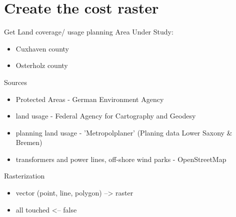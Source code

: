 \documentclass[usenames,dvipsnames,aspectratio=169]{beamer}
\begin{document}
\section{Create the cost raster}
\begin{frame}{Get Land coverage/ usage planning}
	Area Under Study:
	\begin{itemize}
		\item Cuxhaven county
		\item Osterholz county
	\end{itemize}
	
	Sources
	\begin{itemize}
		\item Protected Areas - German Environment Agency
		\item land usage - Federal Agency for Cartography and Geodesy
		\item planning land usage - 'Metropolplaner' (Planing data Lower Saxony \& Bremen)
		\item transformers and power lines, off-shore wind parks  - OpenStreetMap
	\end{itemize}
\end{frame}


\begin{frame}{Rasterization}
	\begin{itemize}
		\item vector (point, line, polygon) --> raster
		\item all touched <-- false
	\end{itemize}
	\vspace{5.0mm}
\end{frame}
\end{document}
